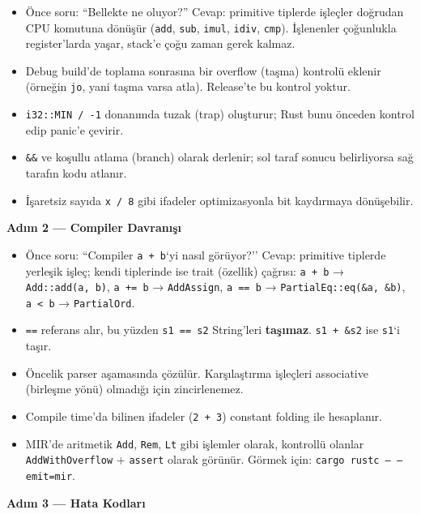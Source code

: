 \documentclass[12pt,a4paper]{article}
\begin{document}
\begin{itemize}
\tightlist
\item
  Önce soru: ``Bellekte ne oluyor?'' Cevap: primitive tiplerde işleçler doğrudan CPU komutuna dönüşür (\texttt{add}, \texttt{sub}, \texttt{imul}, \texttt{idiv}, \texttt{cmp}). İşlenenler çoğunlukla register'larda yaşar, stack'e çoğu zaman gerek kalmaz.
\item
  Debug build'de toplama sonrasına bir overflow (taşma) kontrolü eklenir (örneğin \texttt{jo}, yani taşma varsa atla). Release'te bu kontrol yoktur.
\item
  \texttt{i32::MIN\ /\ -1} donanımda tuzak (trap) oluşturur; Rust bunu önceden kontrol edip panic'e çevirir.
\item
  \texttt{\&\&} ve \texttt{\textbar{}\textbar{}} koşullu atlama (branch) olarak derlenir; sol taraf sonucu belirliyorsa sağ tarafın kodu atlanır.
\item
  İşaretsiz sayıda \texttt{x\ /\ 8} gibi ifadeler optimizasyonla bit kaydırmaya dönüşebilir.
\end{itemize}

\textbf{Adım 2 --- Compiler Davranışı}

\begin{itemize}
\tightlist
\item
  Önce soru: ``Compiler \texttt{a\ +\ b}`yi nasıl görüyor?'' Cevap: primitive tiplerde yerleşik işleç; kendi tiplerinde ise trait (özellik) çağrısı: \texttt{a\ +\ b} → \texttt{Add::add(a,\ b)}, \texttt{a\ +=\ b} → \texttt{AddAssign}, \texttt{a\ ==\ b} → \texttt{PartialEq::eq(\&a,\ \&b)}, \texttt{a\ \textless{}\ b} → \texttt{PartialOrd}.
\item
  \texttt{==} referans alır, bu yüzden \texttt{s1\ ==\ s2} String'leri \textbf{taşımaz}. \texttt{s1\ +\ \&s2} ise \texttt{s1}`i taşır.
\item
  Öncelik parser aşamasında çözülür. Karşılaştırma işleçleri associative (birleşme yönü) olmadığı için zincirlenemez.
\item
  Compile time'da bilinen ifadeler (\texttt{2\ +\ 3}) constant folding ile hesaplanır.
\item
  MIR'de aritmetik \texttt{Add}, \texttt{Rem}, \texttt{Lt} gibi işlemler olarak, kontrollü olanlar \texttt{AddWithOverflow} + \texttt{assert} olarak görünür. Görmek için: \texttt{cargo\ rustc\ --\ --emit=mir}.
\end{itemize}

\textbf{Adım 3 --- Hata Kodları}
\end{document}
